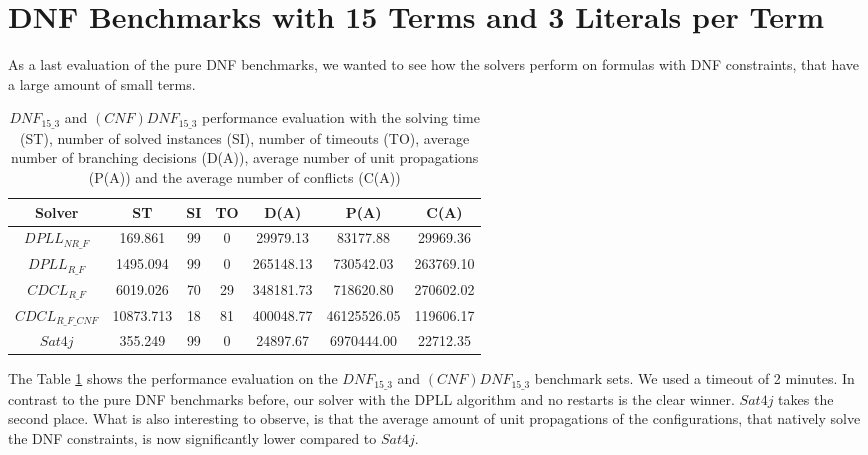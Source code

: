 \section{DNF Benchmarks with 15 Terms and 3 Literals per Term}
\label{sec:dnf153}

As a last evaluation of the pure DNF benchmarks, we wanted to see how the solvers perform on formulas with DNF constraints, that have a large amount of small terms.

\begin{table}[!htb]
\centering
\caption[$DNF_{15\_3}$ and $(CNF)DNF_{15\_3}$ performance evaluation]{$DNF_{15\_3}$ and $(CNF)DNF_{15\_3}$ performance evaluation with the solving time (ST), number of solved instances (SI), number of timeouts (TO), average number of branching decisions (D(A)), average number of unit propagations (P(A)) and the average number of conflicts (C(A))}
\label{tab:dnf153Sat}
\begin{tabular}{|c|c|c|c|c|c|c|}
\hline
Solver & ST & SI & TO & D(A) & P(A) & C(A)\\ 
\hline
$DPLL_{NR\_F}$ & 169.861 & 99 & 0 & 29979.13 & 83177.88 & 29969.36 \\ 
\hline
$DPLL_{R\_F}$ & 1495.094 & 99 & 0 & 265148.13 & 730542.03 & 263769.10 \\ 
\hline
$CDCL_{R\_F}$ & 6019.026 & 70 & 29 & 348181.73 & 718620.80 & 270602.02 \\ 
\hline
$CDCL_{R\_F\_CNF}$ & 10873.713 & 18 & 81 & 400048.77 & 46125526.05 & 119606.17 \\ 
\hline
$Sat4j$ & 355.249 & 99 & 0 & 24897.67 & 6970444.00 & 22712.35 \\ 
\hline
\end{tabular}
\end{table}

The Table \ref{tab:dnf153Sat} shows the performance evaluation on the $DNF_{15\_3}$ and $(CNF)DNF_{15\_3}$ benchmark sets. We used a timeout of 2 minutes. In contrast to the pure DNF benchmarks before, our solver with the DPLL algorithm and no restarts is the clear winner. $Sat4j$ takes the second place. What is also interesting to observe, is that the average amount of unit propagations of the configurations, that natively solve the DNF constraints, is now significantly lower compared to $Sat4j$.

